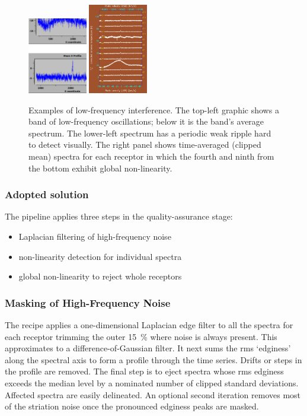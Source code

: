 \documentclass[final,authoryear,5p,times,twocolumn]{elsarticle}
\begin{document}
\begin{figure}[!ht]
\includegraphics[width=0.23\textwidth]{P61_f2a}
\includegraphics[width=0.23\textwidth]{P61_f2b}
\caption{Examples of low-frequency interference.  The top-left graphic
  shows a band of low-frequency oscillations; below it is the band's
  average spectrum.  The lower-left spectrum has a periodic weak
  ripple hard to detect visually.  The right panel shows time-averaged
  (clipped mean) spectra for each receptor in which the fourth and
  ninth from the bottom exhibit global non-linearity.}
\label{fig:badbase:interference}
\end{figure}

\subsubsection{Adopted solution}

The pipeline applies three steps in the quality-assurance stage:
\begin{itemize}
\item Laplacian filtering of high-frequency noise
\item non-linearity detection for individual spectra
\item global non-linearity to reject whole receptors
\end{itemize}

\subsubsection{Masking of High-Frequency Noise}

The recipe applies a one-dimensional Laplacian edge filter to all the
spectra for each receptor trimming the outer 15~\% where noise is
always present.  This approximates to a difference-of-Gaussian
filter. It next sums the rms `edginess' along the spectral axis to
form a profile through the time series.  Drifts or steps in the
profile are removed.  The final step is to eject spectra whose rms
edginess exceeds the median level by a nominated number of clipped
standard deviations.  Affected spectra are easily delineated.  An
optional second iteration removes most of the striation noise once the
pronounced edginess peaks are masked.
\end{document}
